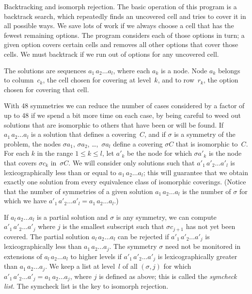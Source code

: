 Backtracking and isomorph rejection.
The basic operation of this program is a backtrack
search, which repeatedly finds an uncovered cell and tries to cover it in
all possible ways. We save lots of work if we always choose a cell that has the
fewest remaining options. The program considers each of those options in turn;
a given option covers certain cells and removes all other options that
cover those cells. We must backtrack if we run out of options for any
uncovered cell.

The solutions are sequences $a_1\,a_2\ldots a_l$, where each $a_k$ is a node.
Node $a_k$ belongs to column~$c_k$, the cell chosen for covering at level~$k$,
and to row~$r_k$, the option chosen for covering that cell.

With 48 symmetries we can reduce the number of cases considered by a factor of
up to 48 if we spend a bit more time on each case, by being careful to weed
out solutions that are isomorphic to others that have been or will be found.
If $a_1\,a_2\ldots a_l$ is a solution that defines a covering~$C$,
and if $\sigma$ is a symmetry of the problem,
the nodes $\sigma a_1$, $\sigma a_2$, \dots,~$\sigma a_l$ define a covering
$\sigma C$ that is isomorphic to~$C$. For each $k$ in the range $1\le k\le l$,
let $a'_k$ be the node for which $\sigma a'_k$ is the node that covers
$\sigma c_k$ in~$\sigma C$. We will consider only solutions such that
$a'_1\,a'_2\ldots a'_l$ is lexicographically less than or equal to
$a_1\,a_2\ldots a_l$; this will guarantee that we obtain exactly one solution
from every equivalence class of isomorphic coverings. (Notice that the number
of symmetries of a given solution $a_1\,a_2\ldots a_l$ is the number of
$\sigma$ for which we have $a'_1\,a'_2\ldots a'_l=a_1\,a_2\ldots a_l$.)

If $a_l\,a_2\ldots a_l$ is a partial solution and $\sigma$ is any symmetry, we
can compute $a'_1\,a'_2\ldots a'_j$ where $j$ is the smallest subscript
such that $\sigma c_{j+1}$ has not yet been covered. The partial solution
$a_l\,a_2\ldots a_l$ can be rejected if $a'_1\,a'_2\ldots a'_j$ is
lexicographically less than $a_1\,a_2\ldots a_j$. The symmetry $\sigma$
need not be monitored in extensions of $a_l\,a_2\ldots a_l$ to higher levels
if $a'_1\,a'_2\ldots a'_j$ is lexicographically greater than $a_1\,a_2\ldots
a_j$. We keep a list at level~$l$ of all $(\sigma,j)$ for which $a'_1\,
a'_2\ldots a'_j=a_1\,a_2\ldots a_j$, where $j$ is defined as above; this
is called the {\it symcheck list}. The symcheck list is the key to
isomorph rejection.

